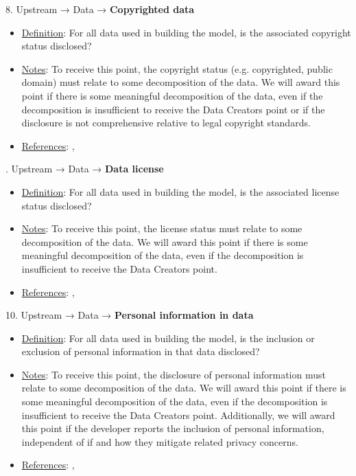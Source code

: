 8. Upstream → Data → \textbf{Copyrighted data}
\vspace{-\parskip}
\begin{itemize}
\item
\underline{Definition}: For all data used in building the model, is the associated copyright status disclosed?
\item
\underline{Notes}: To receive this point, the copyright status (e.g. copyrighted, public domain) must relate to some decomposition of the data. We will award this point if there is some meaningful decomposition of the data, even if the decomposition is insufficient to receive the Data Creators point or if the disclosure is not comprehensive relative to legal copyright standards.
\item
\underline{References}: \citet{bandy2021addressing}, \citet{genlaw2023}
\end{itemize}


. Upstream → Data → \textbf{Data license}
\vspace{-\parskip}
\begin{itemize}
\item
\underline{Definition}: For all data used in building the model, is the associated license status disclosed?
\item
\underline{Notes}: To receive this point, the license status must relate to some decomposition of the data. We will award this point if there is some meaningful decomposition of the data, even if the decomposition is insufficient to receive the Data Creators point.
\item
\underline{References}: \citet{bandy2021addressing}, \citet{genlaw2023}
\end{itemize}


10. Upstream → Data → \textbf{Personal information in data}
\vspace{-\parskip}
\begin{itemize}
\item
\underline{Definition}: For all data used in building the model, is the inclusion or exclusion of personal information in that data disclosed?
\item
\underline{Notes}: To receive this point, the disclosure of personal information must relate to some decomposition of the data. We will award this point if there is some meaningful decomposition of the data, even if the decomposition is insufficient to receive the Data Creators point. Additionally, we will award this point if the developer reports the inclusion of personal information, independent of if and how they mitigate related privacy concerns.
\item
\underline{References}: \citet{west2019data}, \citet{brown2022does}
\end{itemize}


